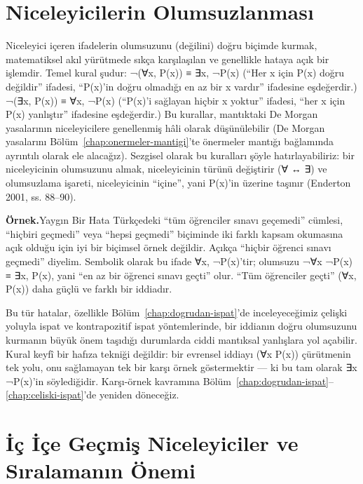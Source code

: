 \section{Niceleyicilerin Olumsuzlanması}

Niceleyici içeren ifadelerin olumsuzunu (değilini) doğru biçimde kurmak, matematiksel akıl yürütmede sıkça karşılaşılan ve genellikle hataya açık bir işlemdir. Temel kural şudur: ¬(∀x, P(x)) ≡ ∃x, ¬P(x) (“Her x için P(x) doğru değildir” ifadesi, “P(x)’in doğru olmadığı en az bir x vardır” ifadesine eşdeğerdir.) ¬(∃x, P(x)) ≡ ∀x, ¬P(x) (“P(x)’i sağlayan hiçbir x yoktur” ifadesi, “her x için P(x) yanlıştır” ifadesine eşdeğerdir.) Bu kurallar, mantıktaki De Morgan yasalarının niceleyicilere genellenmiş hâli olarak düşünülebilir (De Morgan yasalarını Bölüm~\ref{chap:onermeler-mantigi}’te önermeler mantığı bağlamında ayrıntılı olarak ele alacağız). Sezgisel olarak bu kuralları şöyle hatırlayabiliriz: bir niceleyicinin olumsuzunu almak, niceleyicinin türünü değiştirir (∀ ↔ ∃) ve olumsuzlama işareti, niceleyicinin “içine”, yani P(x)’in üzerine taşınır (Enderton 2001, ss. 88–90).

\begin{tcolorbox}[bookbox,colback=cEx]\textbf{\textsf{\textcolor{cAcc}{Örnek.}}}\quad Yaygın Bir Hata Türkçedeki “tüm öğrenciler sınavı geçemedi” cümlesi, “hiçbiri geçmedi” veya “hepsi geçmedi” biçiminde iki farklı kapsam okumasına açık olduğu için iyi bir biçimsel örnek değildir. Açıkça “hiçbir öğrenci sınavı geçmedi” diyelim. Sembolik olarak bu ifade ∀x, ¬P(x)’tir; olumsuzu ¬∀x ¬P(x) ≡ ∃x, P(x), yani “en az bir öğrenci sınavı geçti” olur. “Tüm öğrenciler geçti” (∀x, P(x)) daha güçlü ve farklı bir iddiadır.\end{tcolorbox}

Bu tür hatalar, özellikle Bölüm~\ref{chap:dogrudan-ispat}’de inceleyeceğimiz çelişki yoluyla ispat ve kontrapozitif ispat yöntemlerinde, bir iddianın doğru olumsuzunu kurmanın büyük önem taşıdığı durumlarda ciddi mantıksal yanlışlara yol açabilir. Kural keyfî bir hafıza tekniği değildir: bir evrensel iddiayı (∀x P(x)) çürütmenin tek yolu, onu sağlamayan tek bir karşı örnek göstermektir — ki bu tam olarak ∃x ¬P(x)’in söylediğidir. Karşı-örnek kavramına Bölüm~\ref{chap:dogrudan-ispat}--\ref{chap:celiski-ispat}’de yeniden döneceğiz.

\section{İç İçe Geçmiş Niceleyiciler ve Sıralamanın Önemi}

